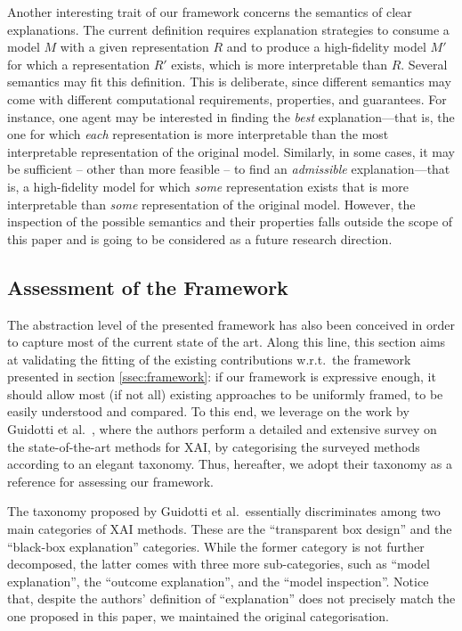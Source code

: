 \documentclass[12pt,a4paper,openright,twoside]{book}
\begin{document}
Another interesting trait of our framework concerns the semantics of clear explanations.
%
The current definition requires explanation strategies to consume a model $M$ with a given representation $R$ and to produce a high-fidelity model $M'$ for which a representation $R'$ exists, which is more interpretable than $R$.
%
Several semantics may fit this definition.
%
This is deliberate, since different semantics may come with different computational requirements, properties, and guarantees.
%
For instance, one agent may be interested in finding the \emph{best} explanation---that is, the one for which \emph{each} representation is more interpretable than the most interpretable representation of the original model.
%
Similarly, in some cases, it may be sufficient -- other than more feasible -- to find an \emph{admissible} explanation---that is, a high-fidelity model for which \emph{some} representation exists that is more interpretable than \emph{some} representation of the original model. 
%
However, the inspection of the possible semantics and their properties falls outside the scope of this paper and is going to be considered as a future research direction.

\subsection{Assessment of the Framework}\label{sec:validation}

The abstraction level of the presented framework has also been conceived in order to capture most of the current state of the art.
%
Along this line, this section aims at validating the fitting of the existing contributions w.r.t.\ the framework presented in section \cref{ssec:framework}: if our framework is expressive enough, it should allow most (if not all) existing approaches to be uniformly framed, to be easily understood and compared.
%
To this end, we leverage on the work by Guidotti et al.\ \cite{GuidottiMRTGP19}, where the authors perform a detailed and extensive survey on the state-of-the-art methods for XAI, by categorising the surveyed methods according to an elegant taxonomy.
%
Thus, hereafter, we adopt their taxonomy as a reference for assessing our framework.

The taxonomy proposed by Guidotti et al.\ essentially discriminates among two main categories of XAI methods.
%
These are the ``transparent box design'' and the ``black-box explanation'' categories. 
%
While the former category is not further decomposed, the latter comes with three more sub-categories, such as ``model explanation'', the ``outcome explanation'', and the ``model inspection''.
%
Notice that, despite the authors' definition of ``explanation'' does not precisely match the one proposed in this paper, we maintained the original categorisation.
\end{document}

